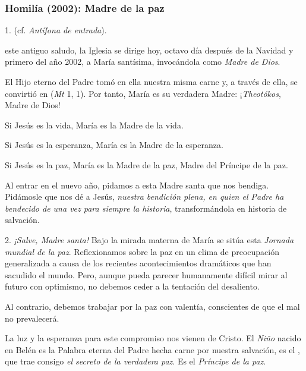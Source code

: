 \subsubsection{Homilía (2002): Madre de la paz}


\begin{body}
	1.  (cf. \emph{Antífona de entrada}).
	
	 este antiguo saludo, la Iglesia se dirige hoy, octavo día después de la Navidad y primero del año 2002, a María santísima, invocándola como \emph{Madre de Dios}.
	
	El Hijo eterno del Padre tomó en ella nuestra misma carne y, a través de ella, se convirtió en  (\emph{Mt} 1, 1). Por tanto, María es su verdadera Madre: ¡\emph{Theotókos}, Madre de Dios!
	
	Si Jesús es la vida, María es la Madre de la vida.
	
	Si Jesús es la esperanza, María es la Madre de la esperanza.
	
	Si Jesús es la paz, María es la Madre de la paz, Madre del Príncipe de la paz.
	
	Al entrar en el nuevo año, pidamos a esta Madre santa que nos bendiga. Pidámosle que nos dé a Jesús, \emph{nuestra bendición plena, en quien el Padre ha bendecido de una vez para siempre la historia}, transformándola en historia de salvación.
	
	2. \emph{¡Salve, Madre santa!} Bajo la mirada materna de María se sitúa esta \emph{Jornada mundial de la paz}. Reflexionamos sobre la paz en un clima de preocupación generalizada a causa de los recientes acontecimientos dramáticos que han sacudido el mundo. Pero, aunque pueda parecer humanamente difícil mirar al futuro con optimismo, no debemos ceder a la tentación del desaliento.
	
	Al contrario, debemos trabajar por la paz con valentía, conscientes de que el mal no prevalecerá.
	
	La luz y la esperanza para este compromiso nos vienen de Cristo. El \emph{Niño} nacido en Belén es la Palabra eterna del Padre hecha carne por nuestra salvación, es el , que trae consigo \emph{el secreto de la verdadera paz}. Es el \emph{Príncipe de la paz}.
	

\end{body}

